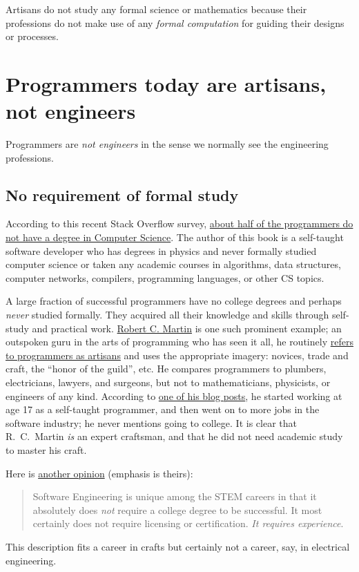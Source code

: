 Artisans do not study any formal science or mathematics because their
professions do not make use of any \emph{formal computation} for guiding
their designs or processes.

\section{Programmers today are artisans, not engineers }

Programmers are \emph{not engineers} in the sense we normally see
the engineering professions.

\subsection{No requirement of formal study }

According to this recent Stack Overflow survey, \href{https://thenextweb.com/insider/2016/04/23/dont-need-go-college-anymore-programmer/}{about half of the programmers do not have a degree in Computer Science}.
The author of this book is a self-taught software developer who has
degrees in physics and never formally studied computer science or
taken any academic courses in algorithms, data structures, computer
networks, compilers, programming languages, or other CS topics. 

A large fraction of successful programmers have no college degrees
and perhaps \emph{never} studied formally. They acquired all their
knowledge and skills through self-study and practical work. \href{https://en.wikipedia.org/wiki/Robert_C._Martin}{Robert C. Martin}
is one such prominent example; an outspoken guru in the arts of programming
who has seen it all, he routinely \href{https://blog.cleancoder.com/uncle-bob/2013/02/01/The-Humble-Craftsman.html}{refers to programmers as artisans}
and uses the appropriate imagery: novices, trade and craft, the ``honor
of the guild'', etc. He compares programmers to plumbers, electricians,
lawyers, and surgeons, but not to mathematicians, physicists, or engineers
of any kind. According to \href{https://blog.cleancoder.com/uncle-bob/2013/11/25/Novices-Coda.html}{one of his blog posts},
he started working at age 17 as a self-taught programmer, and then
went on to more jobs in the software industry; he never mentions going
to college. It is clear that R.~C.~Martin \emph{is} an expert craftsman,
and that he did not need academic study to master his craft.

Here is \href{https://www.quora.com/Can-you-become-a-software-engineer-without-actually-going-to-university-college-How}{another opinion}
(emphasis is theirs):
\begin{quotation}
{\small{}Software Engineering is unique among the STEM careers in
that it absolutely does }\emph{\small{}not}{\small{} require a college
degree to be successful. It most certainly does not require licensing
or certification. }\emph{\small{}It requires experience}{\small{}.}{\small\par}
\end{quotation}
This description fits a career in crafts \textendash{} but certainly
not a career, say, in electrical engineering.

